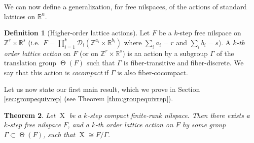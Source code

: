 \documentclass[a4paper,12pt,reqno]{amsart}
\newtheorem{theorem}{Theorem}[section]
\theoremstyle{definition}
\newtheorem{defn}[theorem]{Definition}
\newcommand{\mc}{\mathcal}
\newcommand{\mb}{\mathbb}
\DeclareMathOperator{\tran}{\Theta}
\DeclareMathOperator{\ns}{X}
\begin{document}
\noindent We can now define a generalization, for free nilspaces, of the actions of standard lattices on $\mb{R}^n$.
\begin{defn}[Higher-order lattice actions]
Let $F$ be a $k$-step free nilspace on $\mb{Z}^r\times \mb{R}^s$ (i.e.\ $F=\prod_{i=1}^k \mc{D}_i(\mb{Z}^{a_i}\times \mb{R}^{b_i})$ where $\sum_i a_i=r$ and $\sum_i b_i=s$). A \emph{$k$-th order lattice action} on $F$ (or on $\mb{Z}^r\times \mb{R}^s$) is an action by a subgroup $\Gamma$ of the translation group $\tran(F)$ such that $\Gamma$ is fiber-transitive and fiber-discrete. We say that this action is \emph{cocompact} if $\Gamma$ is also fiber-cocompact.
\end{defn}
Let us now state our first main result, which we prove in Section \ref{sec:groupequivrep} (see Theorem \ref{thm:groupequivrep}).
\begin{theorem}\label{thm:gpcongrep-intro}
Let $\ns$ be a $k$-step compact finite-rank nilspace. Then there exists a $k$-step free nilspace $F$, and a $k$-th order lattice action on $F$ by some group $\Gamma\subset \tran(F)$, such that $\ns\cong F/\Gamma$.
\end{theorem}
\end{document}
